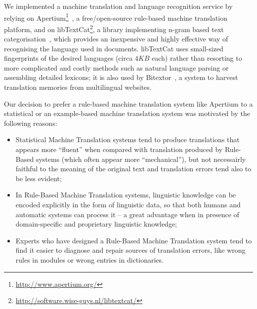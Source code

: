 \documentclass[11pt]{article}
\begin{document}
We implemented a machine translation and language recognition service by relying on Apertium\footnote{\small\url{http://www.apertium.org/}}~\citep{armentano05p}, a free/open-source rule-based machine translation platform, and on libTextCat\footnote{\small\url{http://software.wise-guys.nl/libtextcat/}}, a library implementing n-gram based text categorisation~\citep{textcat}, which provides an inexpensive and highly effective way of recognising the language used in documents. libTextCat uses small-sized fingerprints of the desired languages (circa $4KB$ each) rather than resorting to more complicated and costly methods such as natural language parsing or assembling detailed lexicons; it is also used by Bitextor~\citep{espla-gomis2009bfs}, a system to harvest translation memories from multilingual websites.


Our decision to prefer a rule-based machine translation system like Apertium to a statistical or an example-based machine translation system was  motivated by the following reasons:

\begin{itemize}
 \item Statistical Machine Translation systems tend to produce translations that appears more ``fluent'' when compared with translation produced by Rule-Based systems (which often appear more ``mechanical''), but not necessairly faithful to the meaning of the original text and translation errors tend also to be less evident;
 \item In Rule-Based Machine Translation systems, linguistic knowledge can be encoded explicitly in the form of linguistic data, so that both humans and automatic systems can process it -- a great advantage when in presence of domain-specific and proprietary linguistic knowledge;
 \item Experts who have designed a Rule-Based Machine Translation system tend to find it easier to diagnose and repair sources of translation errors, like wrong rules in modules or wrong entries in dictionaries.
\end{itemize}
\end{document}
